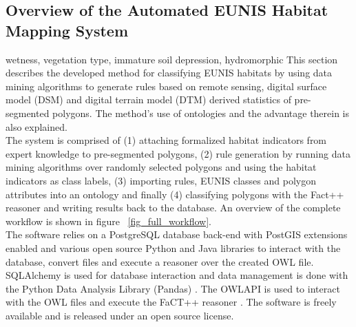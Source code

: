 \documentclass[authoryear, review,12pt,number]{elsarticle}
\begin{document}
\subsection{Overview of the Automated EUNIS Habitat Mapping System}
wetness, vegetation type, immature soil depression, hydromorphic
This section describes the developed method for classifying EUNIS habitats by
using data mining algorithms to generate rules based on remote sensing, digital
surface model (DSM) and digital terrain model (DTM) derived statistics of
pre-segmented polygons. The method's use of ontologies and the advantage
therein is also explained.\\
The system is comprised of (1) attaching
formalized habitat indicators from expert knowledge to pre-segmented polygons,
(2) rule generation by running data mining algorithms over randomly selected
polygons and using the habitat indicators as class labels, (3) importing rules,
EUNIS classes and polygon attributes into an ontology and finally (4)
classifying polygons with the Fact++ reasoner \citep{Tsarkov2006} and writing
results back to the database. An overview of the complete workflow is shown in
figure ~\ref{fig_full_workflow}.\\
The software relies on a PostgreSQL database back-end with PostGIS extensions
enabled and various open source Python and Java libraries to interact with the
database, convert files and execute a reasoner over the created OWL file.
SQLAlchemy is used for database interaction and data management is done with
the Python Data Analysis Library (Pandas) \citep{McKinney2010}. The OWLAPI is
used to interact with the OWL files and execute the FaCT++ reasoner
\citep{Tsarkov2006}. The software is freely available and is released under an
open source license. 
\end{document}
